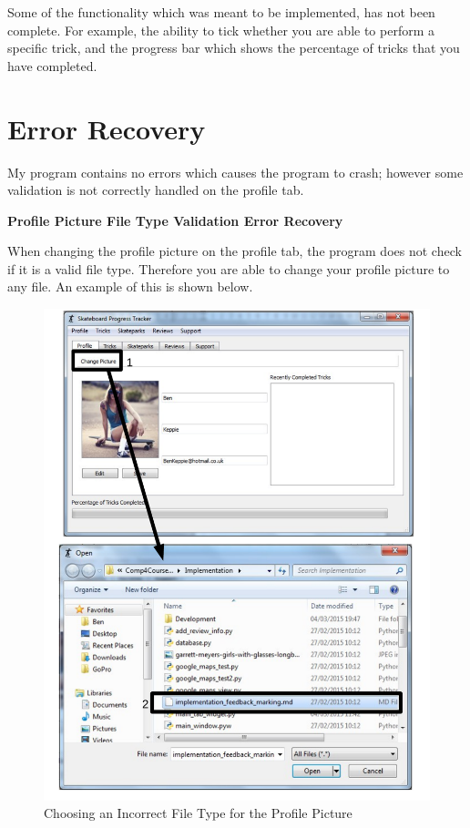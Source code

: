 Some of the functionality which was meant to be implemented, has not been complete. For example, the ability to tick whether you are able to perform a specific trick, and the progress bar which shows the percentage of tricks that you have completed. 





\section{Error Recovery} 

My program contains no errors which causes the program to crash; however some validation is not correctly handled on the profile tab.

\textbf{Profile Picture File Type Validation Error Recovery}

When changing the profile picture on the profile tab, the program does not check if it is a valid file type. Therefore you are able to change your profile picture to any file. An example of this is shown below.

\begin{figure}[H]
    \includegraphics[width=\textwidth]{./Manual/Images/PictureValidation.pdf}
    \caption{Choosing an Incorrect File Type for the Profile Picture} \label{fig:PictureError}
\end{figure}

